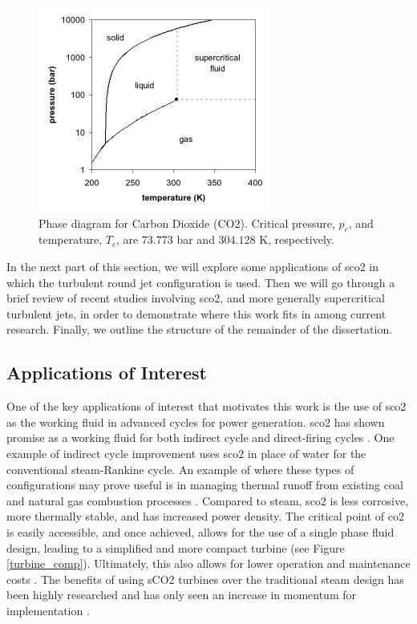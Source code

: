 \begin{figure}[h!]
\begin{center}
\includegraphics[scale=.75]{figures/co2_phase_diagram}
\end{center}
\caption{Phase diagram for Carbon Dioxide (CO2). Critical pressure, $p_c$, and temperature, $T_c$, are $73.773$ bar and $304.128$ K, respectively.}
\label{phase_diagram}
\end{figure}

In the next part of this section, we will explore some applications of \gls{sco2} in which the turbulent round jet configuration is used. Then we will go through a brief review of recent studies involving \gls{sco2}, and more generally supercritical turbulent jets, in order to demonstrate where this work fits in among current research. Finally, we outline the structure of the remainder of the dissertation. 

\subsection{Applications of Interest}
One of the key applications of interest that motivates this work is the use of \gls{sco2} as the working fluid in advanced cycles for power generation. \gls{sco2} has shown promise as a working fluid for both indirect cycle and direct-firing cycles \cite{WEILAND2017293, WHITE2021116447}. One example of indirect cycle improvement uses \gls{sco2} in place of water for the conventional steam-Rankine cycle. An example of where these types of configurations may prove useful is in managing thermal runoff from existing coal and natural gas combustion processes \cite{WEILAND2017293}. Compared to steam, \gls{sco2} is less corrosive, more thermally stable, and has increased power density. The critical point of \gls{co2} is easily accessible, and once achieved, allows for the use of a single phase fluid design, leading to a simplified and more compact turbine (see Figure \ref{turbine_comp}). Ultimately, this also allows for lower operation and maintenance costs \cite{Dodge}. The benefits of using sCO2 turbines over the traditional steam design has been highly researched and has only seen an increase in momentum for implementation \cite{CRESPI2017152, NextGenNucReac, hitthemarket, commercialization}. 

